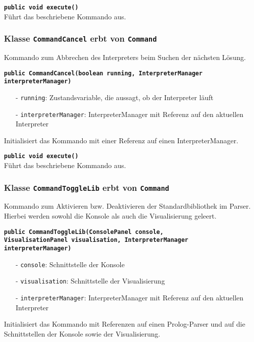 \documentclass[parskip=full,11pt,twoside]{scrartcl}
\begin{document}
\textbf{\texttt{public void execute()}}\\
Führt das beschriebene Kommando aus.

\subsubsection{Klasse \texttt{CommandCancel} erbt von \texttt{Command}}

Kommando zum Abbrechen des Interpreters beim Suchen der nächsten Lösung.

\textbf{\texttt{public CommandCancel(boolean running, InterpreterManager interpreterManager)}}
\begin{itemize}[noitemsep]
    \item[-] \texttt{running}: Zustandsvariable, die aussagt, ob der Interpreter läuft
	\item[-] \texttt{interpreterManager}: InterpreterManager mit Referenz auf den aktuellen Interpreter
\end{itemize}
Initialisiert das Kommando mit einer Referenz auf einen InterpreterManager.

\textbf{\texttt{public void execute()}}\\
Führt das beschriebene Kommando aus.

\subsubsection{Klasse \texttt{CommandToggleLib} erbt von \texttt{Command}}

Kommando zum Aktivieren bzw. Deaktivieren der Standardbibliothek im Parser. Hierbei werden sowohl die Konsole als auch die Visualisierung geleert.

\textbf{\texttt{public CommandToggleLib(ConsolePanel console,\\VisualisationPanel visualisation, InterpreterManager interpreterManager)}}
\begin{itemize}[noitemsep]
	\item[-] \texttt{console}: Schnittstelle der Konsole
	\item[-] \texttt{visualisation}: Schnittstelle der Visualisierung
	\item[-] \texttt{interpreterManager}: InterpreterManager mit Referenz auf den aktuellen Interpreter
\end{itemize}
Initialisiert das Kommando mit Referenzen auf einen Prolog-Parser und auf die Schnittstellen der Konsole sowie der Visualisierung.
\end{document}
